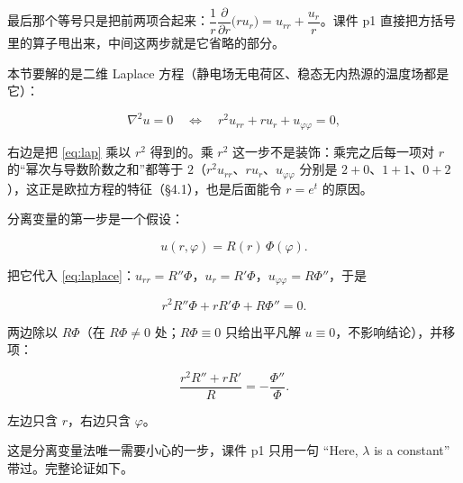\documentclass[11pt]{ctexart}
\let\origsubhdr\subhdr
\renewcommand{\subhdr}[1]{\par\needspace{3\baselineskip}\origsubhdr{#1}}
\let\orighdr\hdr
\renewcommand{\hdr}[2]{\par\needspace{6\baselineskip}\orighdr{#1}{#2}}
\begin{document}
最后那个等号只是把前两项合起来：$\dfrac1r\dfrac{\partial}{\partial r}\big(r u_r\big)=u_{rr}+\dfrac{u_r}{r}$。课件 p1 直接把方括号里的算子甩出来，中间这两步就是它省略的部分。



本节要解的是二维 Laplace 方程（静电场无电荷区、稳态无内热源的温度场都是它）：

\begin{equation}
\nabla^2u=0\quad\Longleftrightarrow\quad
r^2u_{rr}+ru_r+u_{\varphi\varphi}=0,
\label{eq:laplace}
\end{equation}

右边是把 \eqref{eq:lap} 乘以 $r^2$ 得到的。乘 $r^2$ 这一步不是装饰：乘完之后每一项对 $r$ 的“幂次与导数阶数之和”都等于 $2$（$r^2u_{rr}$、$ru_r$、$u_{\varphi\varphi}$ 分别是 $2+0$、$1+1$、$0+2$），这正是欧拉方程的特征（\S4.1），也是后面能令 $r=e^t$ 的原因。

\label{sec:s2}


分离变量的第一步是一个假设：

\begin{equation}
u(r,\varphi)=R(r)\,\Phi(\varphi).
\label{eq:ansatz}
\end{equation}

把它代入 \eqref{eq:laplace}：$u_{rr}=R''\Phi$，$u_r=R'\Phi$，$u_{\varphi\varphi}=R\Phi''$，于是

\[
r^2R''\Phi+rR'\Phi+R\Phi''=0.
\]

两边除以 $R\Phi$（在 $R\Phi\ne0$ 处；$R\Phi\equiv0$ 只给出平凡解 $u\equiv0$，不影响结论），并移项：

\begin{equation}
\frac{r^2R''+rR'}{R}=-\frac{\Phi''}{\Phi}.
\label{eq:sep}
\end{equation}

左边只含 $r$，右边只含 $\varphi$。


这是分离变量法唯一需要小心的一步，课件 p1 只用一句 “Here, $\lambda$ is a constant” 带过。完整论证如下。
\end{document}
